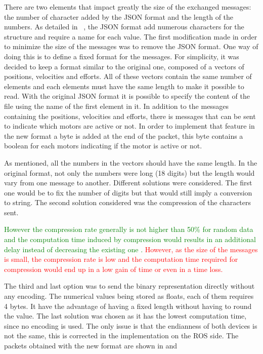 There are two elements that impact greatly the size of the exchanged messages: the number of character added by the JSON format and the length of the numbers.
As detailed in ~, the JSON format add numerous characters for the structure and require a name for each value. The first modification made in order to minimize the size of the messages was to remove the JSON format. One way of doing this is to define a fixed format for the messages. For simplicity, it was decided to keep a format similar to the original one, composed of a vectors of positions, velocities and efforts. All of these vectors contain the same number of elements and each elements must have the same length to make it possible to read. 
With the original \gls{JSON} format it is possible to specify the content of the file using the name of the first element in it. In addition to the messages containing the positions, velocities and efforts, there is messages that can be sent to indicate which motors are active or not. In order to implement that feature in the new format a byte is added at the end of the packet, this byte contains a boolean for each motors indicating if the motor is active or not.

As mentioned, all the numbers in the vectors should have the same length. In the original format, not only the numbers were long (18 digits) but the length would vary from one message to another. Different solutions were considered. The first one would be to fix the number of digits but that would still imply a conversion to string. The second solution considered was the compression of the characters sent. 

 \textcolor{green}{However the compression rate generally is not higher than 50\% for random data and the computation time induced by compression would results in an additional delay instead of decreasing the existing one \cite{simple_compression}\cite{fast_ZIV}.}
 \textcolor{red}{However, as the size of the messages is small, the compression rate is low and the computation time required for compression would end up in a low gain of time or even in a time loss.} 

 The third and last option was to send the binary representation directly without any encoding. The numerical values being stored as floats, each of them requires 4 bytes. It have the advantage of having a fixed length without having to round the value. The last solution was chosen as it has the lowest computation time, since no encoding is used. The only issue is that the endianness of both devices is not the same, this is corrected in the implementation on the ROS side. The packets obtained with the new format are shown in  and 

